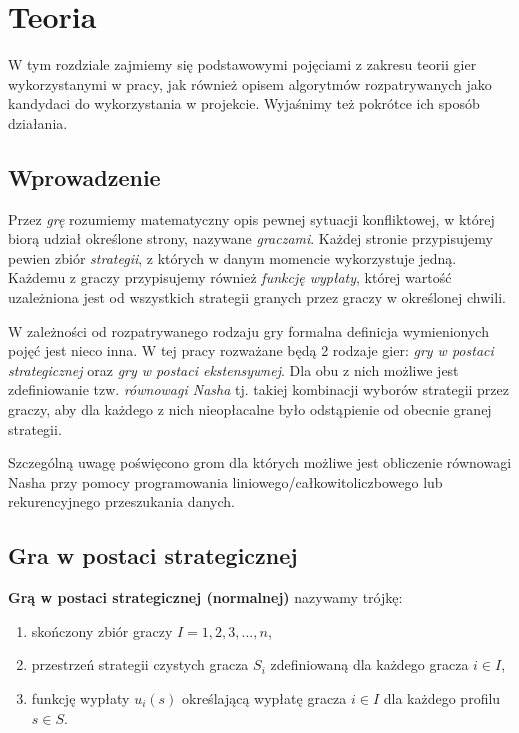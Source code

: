 \documentclass[polish]{standalone}
\begin{document}
\pagestyle{headings}

\chapter{Teoria}

W tym rozdziale zajmiemy się podstawowymi pojęciami z zakresu teorii gier wykorzystanymi w pracy, jak również opisem
algorytmów rozpatrywanych jako kandydaci do wykorzystania w projekcie. Wyjaśnimy też pokrótce ich sposób działania.

\section{Wprowadzenie}

Przez \textit{grę} rozumiemy matematyczny opis pewnej sytuacji konfliktowej, w której biorą udział określone strony,
nazywane \textit{graczami}. Każdej stronie przypisujemy pewien zbiór \textit{strategii}, z których w danym momencie
wykorzystuje jedną. Każdemu z graczy przypisujemy również \textit{funkcję wypłaty}, której wartość uzależniona jest
od wszystkich strategii granych przez graczy w określonej chwili.

W zależności od rozpatrywanego rodzaju gry formalna definicja wymienionych pojęć jest nieco inna. W tej pracy rozważane
będą 2 rodzaje gier: \textit{gry w postaci strategicznej} oraz \textit{gry w postaci ekstensywnej}. Dla obu z nich
możliwe jest zdefiniowanie tzw. \textit{równowagi Nasha} tj. takiej kombinacji wyborów strategii przez graczy, aby dla
każdego z nich nieopłacalne było odstąpienie od obecnie granej strategii.

Szczególną uwagę poświęcono grom dla których możliwe jest obliczenie równowagi Nasha przy pomocy programowania 
liniowego/całkowitoliczbowego lub rekurencyjnego przeszukania danych.

\section{Gra w postaci strategicznej}

\begin{definition}
\textbf{Grą w postaci strategicznej (normalnej)} nazywamy trójkę:
\begin{enumerate}
\item skończony zbiór graczy $I = 1, 2, 3, ..., n$,
\item przestrzeń strategii czystych gracza $S_i$ zdefiniowaną dla każdego gracza $i \in I$,
\item funkcję wypłaty $u_i(s)$ określającą wypłatę gracza $i \in I$ dla każdego profilu $s \in S$.
\end{enumerate}
\cite[str.~4]{FT-GT}
\end{definition}
\end{document}
